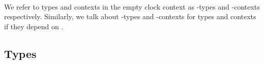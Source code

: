 \begin{code}%
\>[0]\AgdaSpace{}%
\AgdaSpace{}%
\AgdaSymbol{:}\AgdaSpace{}%
\AgdaSpace{}%
\<%
\\
\>[0][@{}l@{\AgdaIndent{0}}]%
\>[2]\AgdaSpace{}%
\AgdaSpace{}%
\AgdaSymbol{:}\AgdaSpace{}%
\<%
\end{code}
We refer to types and contexts in the empty clock context as -types and
-contexts respectively. Similarly, we talk about -types and
-contexts for types and contexts if they depend on .

\subsection{Types}

